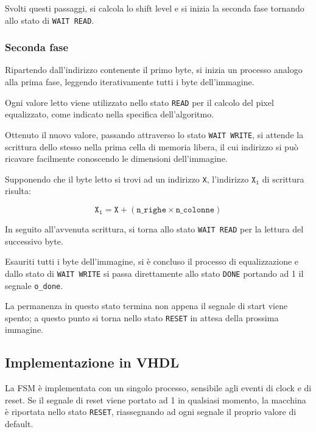 \documentclass[11pt]{article}
\begin{document}
        Svolti questi passaggi, si calcola lo shift level e si inizia la seconda fase tornando allo stato di \texttt{WAIT READ}.
        
        \subsubsection{Seconda fase}
        
       Ripartendo dall'indirizzo contenente il primo byte, si inizia un processo analogo alla prima fase, leggendo iterativamente tutti i byte dell'immagine.
        
        Ogni valore letto viene utilizzato nello stato \texttt{READ} per il calcolo del pixel equalizzato, come indicato nella specifica dell'algoritmo.
        
        Ottenuto il nuovo valore, passando attraverso lo stato \texttt{WAIT WRITE}, si attende la scrittura dello stesso nella prima cella di memoria libera, il cui indirizzo si può ricavare facilmente conoscendo le dimensioni dell'immagine. 
        
        Supponendo che il byte letto si trovi ad un indirizzo \texttt{X}, l'indirizzo $\mathtt{X_1}$ di scrittura risulta:
        
        $$\mathtt{X_1= X + (n\_righe \times n\_colonne)}$$
        
        In seguito all'avvenuta scrittura, si torna allo stato \texttt{WAIT READ} per la lettura del successivo byte.
        
        Esauriti tutti i byte dell'immagine, si è concluso il processo di equalizzazione e dallo stato di \texttt{WAIT WRITE} si passa direttamente allo stato \texttt{DONE} portando ad 1 il segnale \texttt{o\_done}.
        
        La permanenza in questo stato termina non appena il segnale di start viene spento; a questo punto si torna nello stato \texttt{RESET} in attesa della prossima immagine.
        
    \subsection{Implementazione in VHDL}
    
    La FSM è implementata con un singolo processo, sensibile agli eventi di clock e di reset. Se il segnale di reset viene portato ad 1 in qualsiasi momento, la macchina è riportata nello stato \texttt{RESET}, riassegnando ad ogni segnale il proprio valore di default.
    
\end{document}
